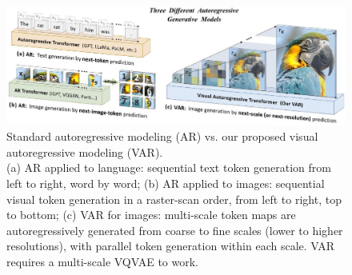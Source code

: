 \documentclass{article}
\begin{document}
\begin{figure}[h]
\begin{center}
  \includegraphics[width=\textwidth]{2025_10_26_62f95e615e8879e267a8g-02(1)}
\caption{Standard autoregressive modeling (AR) vs. our proposed visual autoregressive modeling (VAR). \\
(a) AR applied to language: sequential text token generation from left to right, word by word; (b) AR applied to images: sequential visual token generation in a raster-scan order, from left to right, top to bottom; (c) VAR for images: multi-scale token maps are autoregressively generated from coarse to fine scales (lower to higher resolutions), with parallel token generation within each scale. VAR requires a multi-scale VQVAE to work.}
\end{center}
\end{figure}
\end{document}
